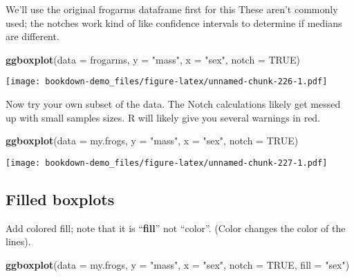 \documentclass[]{book}
\newenvironment{Shaded}{\begin{snugshade}}{\end{snugshade}}
\newcommand{\KeywordTok}[1]{\textcolor[rgb]{0.13,0.29,0.53}{\textbf{#1}}}
\newcommand{\DataTypeTok}[1]{\textcolor[rgb]{0.13,0.29,0.53}{#1}}
\newcommand{\StringTok}[1]{\textcolor[rgb]{0.31,0.60,0.02}{#1}}
\newcommand{\OtherTok}[1]{\textcolor[rgb]{0.56,0.35,0.01}{#1}}
\newcommand{\NormalTok}[1]{#1}
\theoremstyle{definition}
\theoremstyle{definition}
\theoremstyle{definition}
\theoremstyle{remark}
\begin{document}
We'll use the original frogarms dataframe first for this These aren't
commonly used; the notches work kind of like confidence intervals to
determine if medians are different.

\begin{Shaded}
\begin{Highlighting}[]
\KeywordTok{ggboxplot}\NormalTok{(}\DataTypeTok{data =}\NormalTok{ frogarms,}
          \DataTypeTok{y =} \StringTok{"mass"}\NormalTok{,}
          \DataTypeTok{x =} \StringTok{"sex"}\NormalTok{,}
          \DataTypeTok{notch  =} \OtherTok{TRUE}\NormalTok{) }
\end{Highlighting}
\end{Shaded}

\texttt{[image: bookdown-demo\_files/figure-latex/unnamed-chunk-226-1.pdf]}

Now try your own subset of the data. The Notch calculations likely get
messed up with small samples sizes. R will likely give you several
warnings in red.

\begin{Shaded}
\begin{Highlighting}[]
\KeywordTok{ggboxplot}\NormalTok{(}\DataTypeTok{data =}\NormalTok{ my.frogs,}
          \DataTypeTok{y =} \StringTok{"mass"}\NormalTok{,}
          \DataTypeTok{x =} \StringTok{"sex"}\NormalTok{,}
          \DataTypeTok{notch  =} \OtherTok{TRUE}\NormalTok{)}
\end{Highlighting}
\end{Shaded}

\texttt{[image: bookdown-demo\_files/figure-latex/unnamed-chunk-227-1.pdf]}

\subsection{Filled boxplots}\label{filled-boxplots}

Add colored fill; note that it is ``\textbf{fill}'' not ``color''.
(Color changes the color of the lines).

\begin{Shaded}
\begin{Highlighting}[]
\KeywordTok{ggboxplot}\NormalTok{(}\DataTypeTok{data =}\NormalTok{ my.frogs,}
          \DataTypeTok{y =} \StringTok{"mass"}\NormalTok{,}
          \DataTypeTok{x =} \StringTok{"sex"}\NormalTok{,}
          \DataTypeTok{notch  =} \OtherTok{TRUE}\NormalTok{,}
          \DataTypeTok{fill =} \StringTok{"sex"}\NormalTok{)}
\end{Highlighting}
\end{Shaded}
\end{document}
